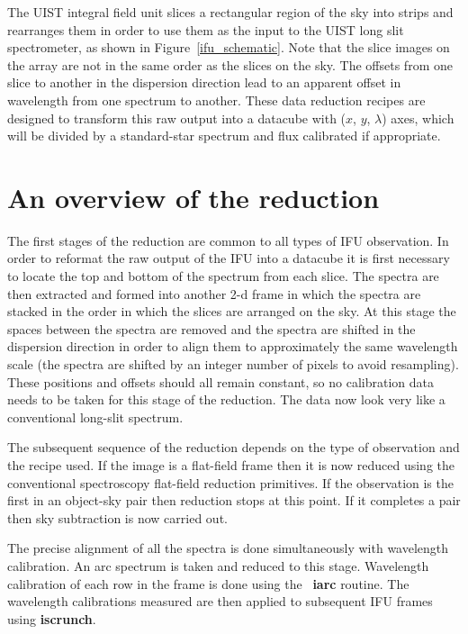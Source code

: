 \documentclass[twoside,11pt]{article}
\newcommand{\xref}[3]{#1}
\renewcommand{\_}{\texttt{\symbol{95}}}
\newcommand{\FIGARO}{\xref{{\sc{Figaro}}}{sun86}{}}
\begin{document}
  The UIST integral field unit slices a rectangular region of the sky
  into strips and rearranges them in order to use them as the input to
  the UIST long slit spectrometer, as shown in
  Figure~\ref{ifu_schematic}. Note that the slice images on the array
  are not in the same order as the slices on the sky. The offsets from
  one slice to another in the dispersion direction lead to an apparent
  offset in wavelength from one spectrum to another. These data
  reduction recipes are designed to transform this raw output into a
  datacube with ($x$, $y$, $\lambda$) axes, which will be
  divided by a standard-star spectrum and flux calibrated if
  appropriate.


\section{An overview of the reduction}

The first stages of the reduction are common to all types of IFU
observation. In order to reformat the raw output of the IFU into a
datacube it is first necessary to locate the top and bottom of the
spectrum from each slice. The spectra are then extracted and formed
into another 2-d frame in which the spectra are stacked in the order
in which the slices are arranged on the sky. At this stage the spaces
between the spectra are removed and the spectra are shifted in the
dispersion direction in order to align them to approximately the same
wavelength scale (the spectra are shifted by an integer number of
pixels to avoid resampling). These positions and offsets should all
remain constant, so no calibration data needs to be taken for this
stage of the reduction. The data now look very like a conventional
long-slit spectrum. 

The subsequent sequence of the reduction depends on the type of
observation and the recipe used.  If the image is a flat-field frame
then it is now reduced using the conventional spectroscopy flat-field
reduction primitives. If the observation is the first in an object-sky
pair then reduction stops at this point. If it completes a pair then
sky subtraction is now carried out.

The precise alignment of all the spectra is done simultaneously with
wavelength calibration. An arc spectrum is taken and reduced to this
stage. Wavelength calibration of each row in the frame is done using
the \FIGARO\ \xref{{\bf iarc}}{sun86}{IARC} routine. The
wavelength calibrations measured are then applied to subsequent IFU
frames using \xref{{\bf iscrunch}}{sun86}{ISCRUNCH}.
\end{document}
